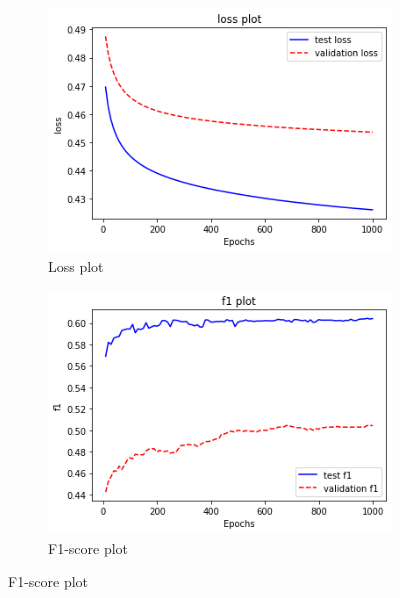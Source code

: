 \begin{figure}[h]
    \centering
    \begin{subfigure}[b]{0.5\textwidth}
                \includegraphics[width=\textwidth]{tex/img/loss_plot.png}
                \caption{Loss plot}
        \end{subfigure}%
        \hfill
    \begin{subfigure}[b]{0.5\textwidth}
                \includegraphics[width=\textwidth]{tex/img/f1_plot.png}
                \caption{F1-score plot}
       \end{subfigure}%
    \end{figure}


